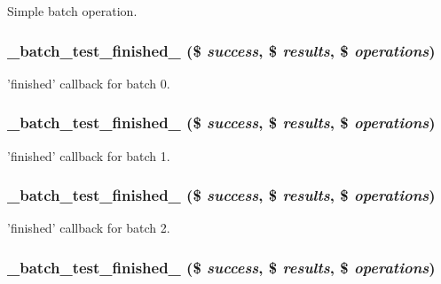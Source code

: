 \label{batch__test_8callbacks_8inc_ac396fb40be0f490431f4bcd459135218}
Simple batch operation. \hypertarget{batch__test_8callbacks_8inc_a5c176c8078f4fad0d4760bbeaefcd3ef}{
\subsubsection[{\_\-batch\_\-test\_\-finished\_\-0}]{\setlength{\rightskip}{0pt plus 5cm}\_\-batch\_\-test\_\-finished\_ (\$ {\em success}, \/  \$ {\em results}, \/  \$ {\em operations})}}
\label{batch__test_8callbacks_8inc_a5c176c8078f4fad0d4760bbeaefcd3ef}
'finished' callback for batch 0. \hypertarget{batch__test_8callbacks_8inc_a109ed818cc4141d389d3b5502520f52a}{
\subsubsection[{\_\-batch\_\-test\_\-finished\_\-1}]{\setlength{\rightskip}{0pt plus 5cm}\_\-batch\_\-test\_\-finished\_ (\$ {\em success}, \/  \$ {\em results}, \/  \$ {\em operations})}}
\label{batch__test_8callbacks_8inc_a109ed818cc4141d389d3b5502520f52a}
'finished' callback for batch 1. \hypertarget{batch__test_8callbacks_8inc_af3dee29f3d0ab709cdcc873292568dc3}{
\subsubsection[{\_\-batch\_\-test\_\-finished\_\-2}]{\setlength{\rightskip}{0pt plus 5cm}\_\-batch\_\-test\_\-finished\_ (\$ {\em success}, \/  \$ {\em results}, \/  \$ {\em operations})}}
\label{batch__test_8callbacks_8inc_af3dee29f3d0ab709cdcc873292568dc3}
'finished' callback for batch 2. \hypertarget{batch__test_8callbacks_8inc_ad4f60f4d44dfb1e22c8095a9b257be13}{
\subsubsection[{\_\-batch\_\-test\_\-finished\_\-3}]{\setlength{\rightskip}{0pt plus 5cm}\_\-batch\_\-test\_\-finished\_ (\$ {\em success}, \/  \$ {\em results}, \/  \$ {\em operations})}}
